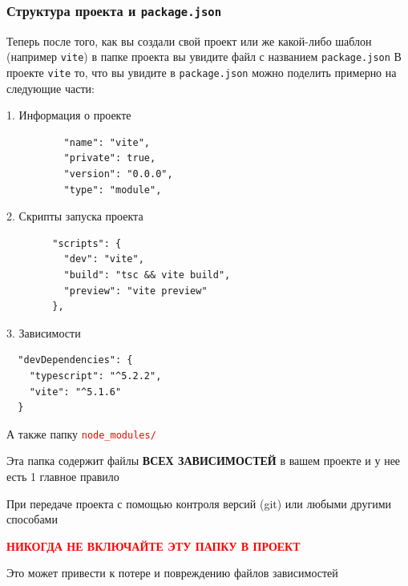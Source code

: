 \documentclass[aspectratio=169]{beamer}
\begin{document}

\begin{frame}
  \frametitle{Структура проекта и \texttt{package.json}}
  Теперь после того, как вы создали свой проект или же какой-либо шаблон (например \texttt{vite}) в папке проекта вы увидите файл с названием \texttt{package.json}
  \bigskip
  В проекте \texttt{vite} то, что вы увидите в \texttt{package.json} можно поделить примерно на следующие части:
  
    \begin{block}{1. Информация о проекте}
      \begin{verbatim}
          "name": "vite",
          "private": true,
          "version": "0.0.0",
          "type": "module",
      \end{verbatim}
    \end{block}

        \begin{block}{2. Скрипты запуска проекта}
      \begin{verbatim}
        "scripts": {
          "dev": "vite",
          "build": "tsc && vite build",
          "preview": "vite preview"
        },
      \end{verbatim}
    \end{block}

        \begin{block}{3. Зависимости}
      \begin{verbatim}
  "devDependencies": {
    "typescript": "^5.2.2",
    "vite": "^5.1.6"
  }
      \end{verbatim}
    \end{block}
    
    
    А также папку \textcolor{red}{\texttt{node\_modules/}}

    \framebreak

    Эта папка содержит файлы \textbf{ВСЕХ ЗАВИСИМОСТЕЙ} в вашем проекте и у нее есть 1 главное правило
    
    \begin{center}
      При передаче проекта с помощью контроля версий (git) или любыми другими способами
    \end{center}
    
      \begin{center}
        
      \textcolor{red}{\textbf{НИКОГДА НЕ ВКЛЮЧАЙТЕ ЭТУ ПАПКУ В ПРОЕКТ }}
    \end{center}

    \begin{center}
      Это может привести к потере и повреждению файлов зависимостей
    \end{center}
    
  \end{frame}
\end{document}
